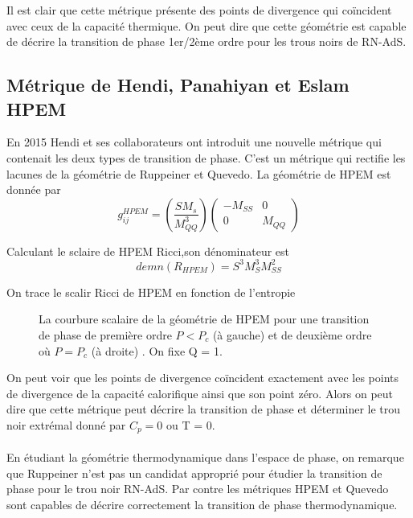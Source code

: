 Il est clair que cette métrique présente des points de divergence qui coïncident avec
ceux de la capacité thermique. On peut dire que cette géométrie est capable de décrire la
transition de phase 1er/2ème ordre pour les trous noirs de RN-AdS.

\subsection{Métrique de Hendi, Panahiyan et Eslam HPEM}
En 2015 Hendi et ses collaborateurs ont introduit une nouvelle métrique \cite{56} qui contenait les deux types de transition de phase. C’est un métrique qui rectifie les lacunes de la
géométrie de Ruppeiner et Quevedo. La géométrie de HPEM est donnée par
\begin{equation}
g_{ij}^{HPEM}=\left( \dfrac{S M_{s}}{M_{QQ}^{3}}\right)
\begin{pmatrix}
-M_{SS}  & 0\\
0        & M_{QQ}
\end{pmatrix}
\end{equation}

Calculant le sclaire de HPEM Ricci,son dénominateur est 
\begin{equation}
demn(R_{HPEM})=S^{3}M_{S}^{3}M_{SS}^{2}
\end{equation}

On trace le scalir Ricci de HPEM  en fonction de l'entropie\\

\begin{figure}[H]
	\caption{La courbure scalaire de la géométrie de HPEM pour une transition de phase
		de première ordre $P < P_{c}$ (à gauche) et de deuxième ordre où $P = P_{c}$ (à droite) . On fixe Q = 1.}
\end{figure}

On peut voir que les points de divergence coïncident exactement avec les points de
divergence de la capacité calorifique ainsi que son point zéro. Alors on peut dire que cette
métrique peut décrire la transition de phase et déterminer le trou noir extrémal donné
par $C_{p} = 0$ ou T = 0.\\
\\
En étudiant la géométrie thermodynamique dans l'espace de phase, on remarque que
Ruppeiner n'est pas un candidat approprié pour étudier la transition de phase pour le
trou noir RN-AdS. Par contre les métriques HPEM et Quevedo sont capables de décrire
correctement la transition de phase thermodynamique.

 
 
